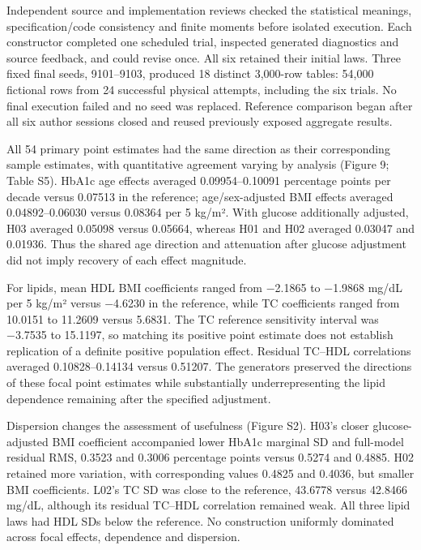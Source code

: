 \documentclass[11pt,letterpaper]{article}
\begin{document}
Independent source and implementation reviews checked the statistical meanings, specification/\allowbreak{}code consistency and finite moments before isolated execution. Each constructor completed one scheduled trial, inspected generated diagnostics and source feedback, and could revise once. All six retained their initial laws. Three fixed final seeds, 9101–\allowbreak{}9103, produced 18 distinct 3,000-row tables: 54,000 fictional rows from 24 successful physical attempts, including the six trials. No final execution failed and no seed was replaced. Reference comparison began after all six author sessions closed and reused previously exposed aggregate results.


All 54 primary point estimates had the same direction as their corresponding sample estimates, with quantitative agreement varying by analysis (Figure 9; Table S5). HbA1c age effects averaged 0.09954–\allowbreak{}0.10091 percentage points per decade versus 0.07513 in the reference; age/\allowbreak{}sex-adjusted BMI effects averaged 0.04892–\allowbreak{}0.06030 versus 0.08364 per 5 kg/\allowbreak{}m². With glucose additionally adjusted, H03 averaged 0.05098 versus 0.05664, whereas H01 and H02 averaged 0.03047 and 0.01936. Thus the shared age direction and attenuation after glucose adjustment did not imply recovery of each effect magnitude.


For lipids, mean HDL BMI coefficients ranged from −2.1865 to −1.9868 mg/\allowbreak{}dL per 5 kg/\allowbreak{}m² versus −4.6230 in the reference, while TC coefficients ranged from 10.0151 to 11.2609 versus 5.6831. The TC reference sensitivity interval was −3.7535 to 15.1197, so matching its positive point estimate does not establish replication of a definite positive population effect. Residual TC–\allowbreak{}HDL correlations averaged 0.10828–\allowbreak{}0.14134 versus 0.51207. The generators preserved the directions of these focal point estimates while substantially underrepresenting the lipid dependence remaining after the specified adjustment.


Dispersion changes the assessment of usefulness (Figure S2). H03's closer glucose-adjusted BMI coefficient accompanied lower HbA1c marginal SD and full-model residual RMS, 0.3523 and 0.3006 percentage points versus 0.5274 and 0.4885. H02 retained more variation, with corresponding values 0.4825 and 0.4036, but smaller BMI coefficients. L02's TC SD was close to the reference, 43.6778 versus 42.8466 mg/\allowbreak{}dL, although its residual TC–\allowbreak{}HDL correlation remained weak. All three lipid laws had HDL SDs below the reference. No construction uniformly dominated across focal effects, dependence and dispersion.
\end{document}
